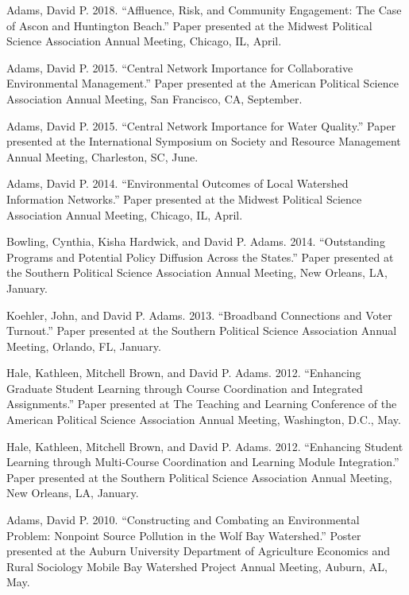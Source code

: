 \documentclass[12pt,letterpaper]{article}
\renewenvironment{itemize}{
  \begin{list}{}{
    \setlength{\leftmargin}{1.5em}
    \setlength{\itemsep}{0.25em}
    \setlength{\parskip}{0pt}
    \setlength{\parsep}{0.25em}
  }
}{
  \end{list}
}
\begin{document}
\begin{itemize}
      \item Adams, David P. 2018. ``Affluence, Risk, and Community Engagement: The Case of Ascon and Huntington Beach.'' Paper presented at the Midwest Political Science Association Annual Meeting, Chicago, IL, April.
      
      \item Adams, David P. 2015. ``Central Network Importance for Collaborative Environmental Management.'' Paper presented at the American Political Science Association Annual Meeting, San Francisco, CA, September.
      
      \item Adams, David P. 2015. ``Central Network Importance for Water Quality.'' Paper presented at the International Symposium on Society and Resource Management Annual Meeting, Charleston, SC, June.
      
      \item Adams, David P. 2014. ``Environmental Outcomes of Local Watershed Information Networks.'' Paper presented at the Midwest Political Science Association Annual Meeting, Chicago, IL, April.
      
      \item Bowling, Cynthia, Kisha Hardwick, and David P. Adams. 2014. ``Outstanding Programs and Potential Policy Diffusion Across the States.'' Paper presented at the Southern Political Science Association Annual Meeting, New Orleans, LA, January.
      
      \item Koehler, John, and David P. Adams. 2013. ``Broadband Connections and Voter Turnout.'' Paper presented at the Southern Political Science Association Annual Meeting, Orlando, FL, January.
      
      \item Hale, Kathleen, Mitchell Brown, and David P. Adams. 2012. ``Enhancing Graduate Student Learning through Course Coordination and Integrated Assignments.'' Paper presented at The Teaching and Learning Conference of the American Political Science Association Annual Meeting, Washington, D.C., May.
      
      \item Hale, Kathleen, Mitchell Brown, and David P. Adams. 2012. ``Enhancing Student Learning through Multi-Course Coordination and Learning Module Integration.'' Paper presented at the Southern Political Science Association Annual Meeting, New Orleans, LA, January.
      
      \item Adams, David P. 2010. ``Constructing and Combating an Environmental Problem: Nonpoint Source Pollution in the Wolf Bay Watershed.'' Poster presented at the Auburn University Department of Agriculture Economics and Rural Sociology Mobile Bay Watershed Project Annual Meeting, Auburn, AL, May.
  \end{itemize}
  
\end{document}
